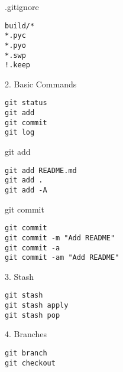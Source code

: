 \documentclass{beamer}
\begin{document}
\begin{frame}[fragile]

    {\LARGE .gitignore}\\

    \begin{verbatim}
build/*
*.pyc
*.pyo
*.swp
!.keep
    \end{verbatim}

\end{frame}

\begin{frame}[fragile]

    {\LARGE 2. Basic Commands}\\

    \begin{verbatim}
git status
git add
git commit
git log
    \end{verbatim}

\end{frame}

\begin{frame}[fragile]

    {\LARGE git add}\\

    \begin{verbatim}
git add README.md
git add .
git add -A
    \end{verbatim}

\end{frame}

\begin{frame}[fragile]

    {\LARGE git commit}\\

    \begin{verbatim}
git commit
git commit -m "Add README"
git commit -a
git commit -am "Add README"
    \end{verbatim}

\end{frame}

\begin{frame}[fragile]

    {\LARGE 3. Stash}\\

    \begin{verbatim}
git stash
git stash apply
git stash pop
    \end{verbatim}

\end{frame}

\begin{frame}[fragile]

    {\LARGE 4. Branches}\\

    \begin{verbatim}
git branch
git checkout
    \end{verbatim}

\end{frame}
\end{document}
